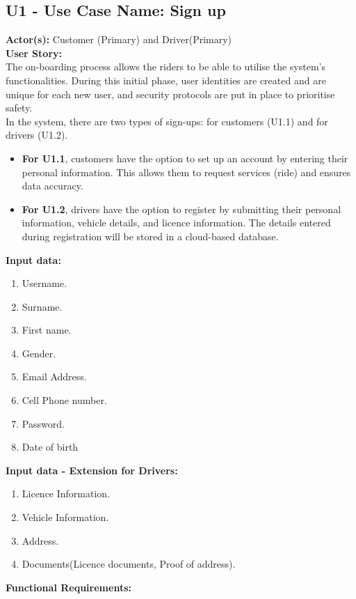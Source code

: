 \documentclass[9pt]{report}
\begin{document}
\subsection*{U1 - Use Case Name: Sign up}
\textbf{Actor(s):} Customer (Primary) and Driver(Primary)
\textbf{\\User Story:} \\The on-boarding process allows the riders to be able to utilise the system's functionalities. During this initial phase, user identities are created and are unique for each new user, and security protocols are put in place to prioritise safety.\\In the system, there are two types of sign-ups: for customers (U1.1) and for drivers (U1.2).
\begin{itemize}
    \item \textbf{For U1.1}, customers have the option to set up an account by entering their personal information. This allows them to request services (ride) and ensures data accuracy.
    \item \textbf{For U1.2}, drivers have the option to register by submitting their personal information, vehicle details, and licence information. The details entered during registration will be stored in a cloud-based database.
\end{itemize}
\textbf{Input data:}
\begin{enumerate}
    \item Username.
    \item Surname.
    \item First name.
    \item Gender.
    \item Email Address.
    \item Cell Phone number.
    \item Password.
    \item Date of birth
\end{enumerate}
\textbf{Input data - Extension for Drivers:}
\begin{enumerate}
    \item Licence Information.
    \item Vehicle Information.
    \item Address.
    \item Documents(Licence documents, Proof of address).
\end{enumerate}
\textbf{Functional Requirements:}
\end{document}
